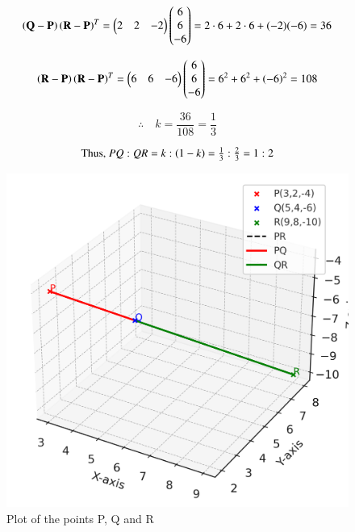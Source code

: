 \documentclass[journal,12pt,onecolumn]{IEEEtran}
\begin{document}
\begin{equation}
\left(\mathbf{Q}-\mathbf{P}\right)\left(\mathbf{R}-\mathbf{P}\right)^T
= \begin{pmatrix}2 & 2 & -2\end{pmatrix}\begin{pmatrix}6 \\ 6 \\ -6\end{pmatrix}
= 2\cdot 6 + 2\cdot 6 + (-2)(-6) 
= 36
\end{equation}

\begin{equation}
\left(\mathbf{R}-\mathbf{P}\right)\left(\mathbf{R}-\mathbf{P}\right)^T
= \begin{pmatrix}6 & 6 & -6\end{pmatrix}\begin{pmatrix}6 \\ 6 \\ -6\end{pmatrix}
= 6^2 + 6^2 + \left(-6\right)^2
= 108
\end{equation}

\begin{equation}
\therefore \quad k = \frac{36}{108} = \frac{1}{3}
\end{equation}

\begin{equation}
\text{Thus, } {P}{Q}:{Q}{R} = k:\left(1-k\right) = \tfrac{1}{3}:\tfrac{2}{3} = 1:2
\end{equation}

\begin{figure}[h]
    \centering
    \includegraphics[width=0.5\linewidth]{figs/points_plot.png}
    \caption{Plot of the points P, Q and R}
\end{figure}
\end{document}
